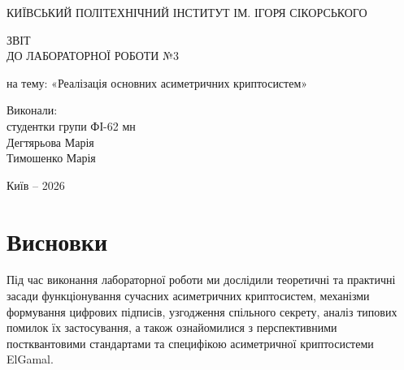 \documentclass[12pt,a4paper]{article}
\begin{document}
\begin{titlepage}

\begin{center}

КИЇВСЬКИЙ ПОЛІТЕХНІЧНИЙ ІНСТИТУТ
ІМ. ІГОРЯ СІКОРСЬКОГО

\vspace{2cm}

{\large ЗВІТ}\\
{\large ДО ЛАБОРАТОРНОЇ РОБОТИ №3}

\vspace{1cm}

{\large на тему: «Реалізація основних асиметричних криптосистем»}

\vspace{0.5cm}

\textbf{}

\end{center}

\vfill

\begin{flushright}
\begin{minipage}{0.4\textwidth}

Виконали:\\
студентки групи ФІ-62 мн\\
Дегтярьова Марія\\
Тимошенко Марія

\end{minipage}
\end{flushright}

\vfill

\begin{center}
Київ -- 2026
\end{center}

\end{titlepage}

\tableofcontents
\newpage










\section*{Висновки}

Під час виконання лабораторної роботи ми дослідили теоретичні та практичні засади функціонування
сучасних асиметричних криптосистем, механізми формування цифрових підписів, узгодження спільного
секрету, аналіз типових помилок їх застосування, а також ознайомилися з перспективними постквантовими
стандартами та специфікою асиметричної криптосистеми ElGamal.
\end{document}

